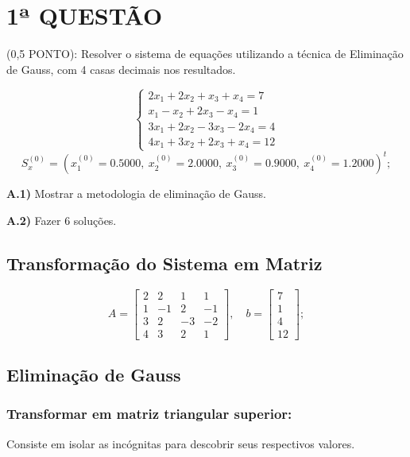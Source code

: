 \documentclass[12pt,a4paper]{article}
\begin{document}
\tableofcontents
\newpage

\noindent \section{1ª QUESTÃO} (0,5 PONTO): Resolver o sistema de equações utilizando a técnica de Eliminação de Gauss, com 4 casas decimais nos resultados.

\[
\begin{cases}
2x_1 + 2x_2 + x_3 + x_4 = 7 \\
x_1 - x_2 + 2x_3 - x_4 = 1 \\
3x_1 + 2x_2 - 3x_3 - 2x_4 = 4 \\
4x_1 + 3x_2 + 2x_3 + x_4 = 12
\end{cases}
\]
\[
S_x^{(0)} = (x_1^{(0)} = 0.5000,\ x_2^{(0)} = 2.0000,\ x_3^{(0)} = 0.9000,\ x_4^{(0)} = 1.2000)^t;
\]

\textbf{A.1)} Mostrar a metodologia de eliminação de Gauss.

\textbf{A.2)} Fazer 6 soluções.

\vspace{0.5cm}

\subsection{Transformação do Sistema em Matriz}

\[
A = \begin{bmatrix}
2 & 2 & 1 & 1 \\
1 & -1 & 2 & -1 \\
3 & 2 & -3 & -2 \\
4 & 3 & 2 & 1
\end{bmatrix}, \quad
b = \begin{bmatrix}
7 \\ 1 \\ 4 \\ 12
\end{bmatrix};
\]

\subsection{Eliminação de Gauss}

\subsubsection{Transformar em matriz triangular superior:}

Consiste em isolar as incógnitas para descobrir seus respectivos valores.
\end{document}
